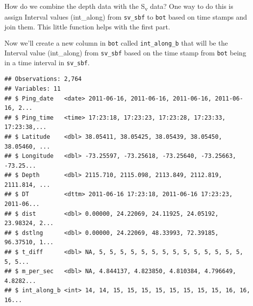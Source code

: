\documentclass[]{article}
\newenvironment{Shaded}{\begin{snugshade}}{\end{snugshade}}
\newcommand{\CommentTok}[1]{\textcolor[rgb]{0.56,0.35,0.01}{\textit{#1}}}
\newcommand{\ControlFlowTok}[1]{\textcolor[rgb]{0.13,0.29,0.53}{\textbf{#1}}}
\newcommand{\DecValTok}[1]{\textcolor[rgb]{0.00,0.00,0.81}{#1}}
\newcommand{\KeywordTok}[1]{\textcolor[rgb]{0.13,0.29,0.53}{\textbf{#1}}}
\newcommand{\NormalTok}[1]{#1}
\newcommand{\OperatorTok}[1]{\textcolor[rgb]{0.81,0.36,0.00}{\textbf{#1}}}
\newcommand{\OtherTok}[1]{\textcolor[rgb]{0.56,0.35,0.01}{#1}}
\newcommand{\StringTok}[1]{\textcolor[rgb]{0.31,0.60,0.02}{#1}}
\begin{document}
How do we combine the depth data with the S\textsubscript{v} data? One
way to do this is assign Interval values (int\_along) from
\texttt{sv\_sbf} to \texttt{bot} based on time stamps and join them.
This little function helps with the first part.

\begin{Shaded}
\end{Shaded}

Now we'll create a new column in \texttt{bot} called
\texttt{int\_along\_b} that will be the Interval value (int\_along) from
\texttt{sv\_sbf} based on the time stamp from \texttt{bot} being in a
time interval in \texttt{sv\_sbf}.

\begin{Shaded}
\end{Shaded}

\begin{verbatim}
## Observations: 2,764
## Variables: 11
## $ Ping_date   <date> 2011-06-16, 2011-06-16, 2011-06-16, 2011-06-16, 2...
## $ Ping_time   <time> 17:23:18, 17:23:23, 17:23:28, 17:23:33, 17:23:38,...
## $ Latitude    <dbl> 38.05411, 38.05425, 38.05439, 38.05450, 38.05460, ...
## $ Longitude   <dbl> -73.25597, -73.25618, -73.25640, -73.25663, -73.25...
## $ Depth       <dbl> 2115.710, 2115.098, 2113.849, 2112.819, 2111.814, ...
## $ DT          <dttm> 2011-06-16 17:23:18, 2011-06-16 17:23:23, 2011-06...
## $ dist        <dbl> 0.00000, 24.22069, 24.11925, 24.05192, 23.98324, 2...
## $ dstlng      <dbl> 0.00000, 24.22069, 48.33993, 72.39185, 96.37510, 1...
## $ t_diff      <dbl> NA, 5, 5, 5, 5, 5, 5, 5, 5, 5, 5, 5, 5, 5, 5, 5, 5...
## $ m_per_sec   <dbl> NA, 4.844137, 4.823850, 4.810384, 4.796649, 4.8282...
## $ int_along_b <int> 14, 14, 15, 15, 15, 15, 15, 15, 15, 15, 16, 16, 16...
\end{verbatim}
\end{document}
